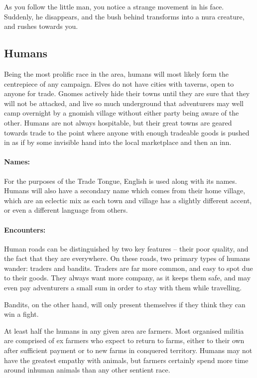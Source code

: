 \begin{multicols}{2}
\begin{boxtext}
	As you follow the little man, you notice a strange movement in his face.
	Suddenly, he disappears, and the bush behind transforms into a nura creature, and rushes towards you.

\end{boxtext}

\subsection{Humans}

Being the most prolific race in the area, humans will most likely form the centrepiece of any campaign.  Elves do not have cities with taverns, open to anyone for trade.  Gnomes actively hide their towns until they are sure that they will not be attacked, and live so much underground that adventurers may well camp overnight by a gnomish village without either party being aware of the other.  Humans are not always hospitable, but their great towns are geared towards trade to the point where anyone with enough tradeable goods is pushed in as if by some invisible hand into the local marketplace and then an inn.

\paragraph{Names:} For the purposes of the Trade Tongue, English is used along with its names.
Humans will also have a secondary name which comes from their home village, which are an eclectic mix as each town and village has a slightly different accent, or even a different language from others.

\paragraph{Encounters:} Human roads can be distinguished by two key features -- their poor quality, and the fact that they are everywhere.
On these roads, two primary types of humans wander: traders and bandits.
Traders are far more common, and easy to spot due to their goods.
They always want more company, as it keeps them safe, and may even pay adventurers a small sum in order to stay with them while travelling.

Bandits, on the other hand, will only present themselves if they think they can win a fight.

\label{human_trader}

At least half the humans in any given area are farmers.
Most organised militia are comprised of ex farmers who expect to return to farms, either to their own after sufficient payment or to new farms in conquered territory.
Humans may not have the greatest empathy with animals, but farmers certainly spend more time around inhuman animals than any other sentient race.


\end{multicols}
